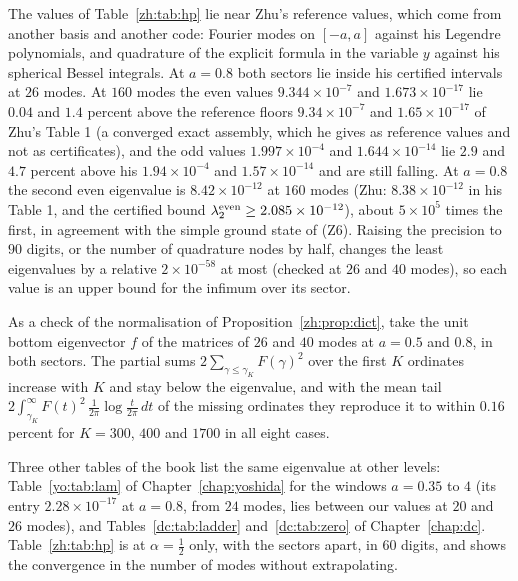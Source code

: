 The values of Table~\ref{zh:tab:hp} lie near Zhu's reference values, which come from another basis and another code: Fourier modes on $[-a,a]$ against his Legendre polynomials, and quadrature of the explicit formula in the variable $y$ against his spherical Bessel integrals. At $a=0.8$ both sectors lie inside his certified intervals at $26$ modes. At $160$ modes the even values $9.344\times10^{-7}$ and $1.673\times10^{-17}$ lie $0.04$ and $1.4$ percent above the reference floors $9.34\times10^{-7}$ and $1.65\times10^{-17}$ of Zhu's Table 1 (a converged exact assembly, which he gives as reference values and not as certificates), and the odd values $1.997\times10^{-4}$ and $1.644\times10^{-14}$ lie $2.9$ and $4.7$ percent above his $1.94\times10^{-4}$ and $1.57\times10^{-14}$ and are still falling. At $a=0.8$ the second even eigenvalue is $8.42\times10^{-12}$ at $160$ modes (Zhu: $8.38\times10^{-12}$ in his Table 1, and the certified bound $\lambda_2^{\rm even}\ge2.085\times10^{-12}$), about $5\times10^5$ times the first, in agreement with the simple ground state of (Z6). Raising the precision to $90$ digits, or the number of quadrature nodes by half, changes the least eigenvalues by a relative $2\times10^{-58}$ at most (checked at $26$ and $40$ modes), so each value is an upper bound for the infimum over its sector.

As a check of the normalisation of Proposition~\ref{zh:prop:dict}, take the unit bottom eigenvector $f$ of the matrices of $26$ and $40$ modes at $a=0.5$ and $0.8$, in both sectors. The partial sums $2\sum_{\gamma\le\gamma_K}F(\gamma)^2$ over the first $K$ ordinates increase with $K$ and stay below the eigenvalue, and with the mean tail $2\int_{\gamma_K}^\infty F(t)^2\,\frac1{2\pi}\log\frac t{2\pi}\,dt$ of the missing ordinates they reproduce it to within $0.16$ percent for $K=300$, $400$ and $1700$ in all eight cases.

Three other tables of the book list the same eigenvalue at other levels: Table~\ref{yo:tab:lam} of Chapter~\ref{chap:yoshida} for the windows $a=0.35$ to $4$ (its entry $2.28\times10^{-17}$ at $a=0.8$, from $24$ modes, lies between our values at $20$ and $26$ modes), and Tables~\ref{dc:tab:ladder} and~\ref{dc:tab:zero} of Chapter~\ref{chap:dc}. Table~\ref{zh:tab:hp} is at $\alpha=\frac12$ only, with the sectors apart, in $60$ digits, and shows the convergence in the number of modes without extrapolating.
